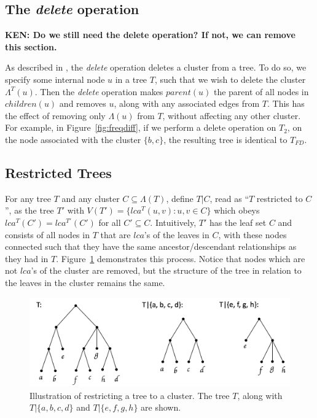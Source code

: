 \documentclass[final,1p,times]{elsarticle}
\newcommand{\leafset}{\Lambda}
\begin{document}
    \subsection{The \textit{delete} operation}
    \label{subsec:delete}

    {\bf KEN: Do we still need the delete operation? If not, we can remove this section.}

    As described in \cite{jansson2018algorithms}, the \textit{delete} operation deletes a cluster from a tree. To do so, we specify some internal node $u$ in a tree $T$, such that we wish to delete the cluster $\leafset^{T}(u)$. Then the \textit{delete} operation makes $parent(u)$ the parent of all nodes in $children(u)$ and removes $u$, along with any associated edges from $T$. This has the effect of removing only $\leafset(u)$ from $T$, without affecting any other cluster. For example, in Figure~\ref{fig:freqdiff}, if we perform a delete operation on $T_2$, on the node associated with the cluster $\{b, c\}$, the resulting tree is identical to $T_{FD}$.

    \subsection{Restricted Trees}
    \label{subsec:restrictedtree}

    For any tree $T$ and any cluster $C \subseteq \leafset(T)$, define $T|C$, read as ``$T$ restricted to $C$'', as the tree $T'$ with $V(T') = \{lca^T(u, v) : u, v \in C\}$ which obeys $lca^T(C') = lca^{T'}(C')$ for all $C' \subseteq C$. Intuitively, $T'$ has the leaf set $C$ and consists of all nodes in $T$ that are $lca$'s of the leaves in $C$, with these nodes connected such that they have the same ancestor/descendant relationships as they had in $T$. Figure~\ref{fig:restrictedtree} demonstrates this process. Notice that nodes which are not $lca$'s of the cluster are removed, but the structure of the tree in relation to the leaves in the cluster remains the same.

    \begin{figure}[ht]
        \includegraphics[scale=0.5]{restrictedsubtree}
        \centering
        \caption[Restricted Trees]{Illustration of restricting a tree to a cluster. The tree $T$, along with $T|\{a, b, c, d\}$ and $T|\{e, f, g, h\}$ are shown.}
        \label{fig:restrictedtree}
    \end{figure}
\end{document}
